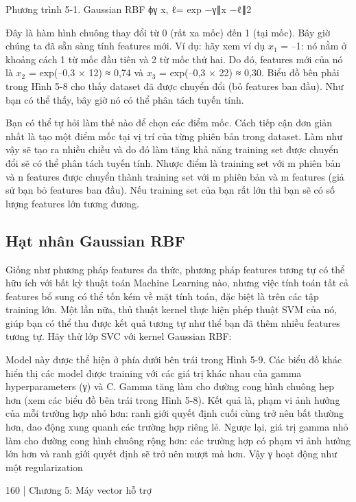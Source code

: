 Phương trình 5-1. Gaussian RBF ϕγ x, ℓ= exp −γ∥x −ℓ∥2

Đây là hàm hình chuông thay đổi từ 0 (rất xa mốc) đến 1 (tại mốc). Bây giờ chúng ta đã sẵn sàng tính features mới. Ví dụ: hãy xem ví dụ $x_{1}$ = –1: nó nằm ở khoảng cách 1 từ mốc đầu tiên và 2 từ mốc thứ hai. Do đó, features mới của nó là $x_{2}$ = exp(–0,3 × 12) ≈ 0,74 và $x_{3}$ = exp(–0,3 × 22) ≈ 0,30. Biểu đồ bên phải trong Hình 5-8 cho thấy dataset đã được chuyển đổi (bỏ features ban đầu). Như bạn có thể thấy, bây giờ nó có thể phân tách tuyến tính.

Bạn có thể tự hỏi làm thế nào để chọn các điểm mốc. Cách tiếp cận đơn giản nhất là tạo một điểm mốc tại vị trí của từng phiên bản trong dataset. Làm như vậy sẽ tạo ra nhiều chiều và do đó làm tăng khả năng training set được chuyển đổi sẽ có thể phân tách tuyến tính. Nhược điểm là training set với m phiên bản và n features được chuyển thành training set với m phiên bản và m features (giả sử bạn bỏ features ban đầu). Nếu training set của bạn rất lớn thì bạn sẽ có số lượng features lớn tương đương.

\subsection{Hạt nhân Gaussian RBF}

Giống như phương pháp features đa thức, phương pháp features tương tự có thể hữu ích với bất kỳ thuật toán Machine Learning nào, nhưng việc tính toán tất cả features bổ sung có thể tốn kém về mặt tính toán, đặc biệt là trên các tập training lớn. Một lần nữa, thủ thuật kernel thực hiện phép thuật SVM của nó, giúp bạn có thể thu được kết quả tương tự như thể bạn đã thêm nhiều features tương tự. Hãy thử lớp SVC với kernel Gaussian RBF:

Model này được thể hiện ở phía dưới bên trái trong Hình 5-9. Các biểu đồ khác hiển thị các model được training với các giá trị khác nhau của gamma hyperparameters (γ) và C. Gamma tăng làm cho đường cong hình chuông hẹp hơn (xem các biểu đồ bên trái trong Hình 5-8). Kết quả là, phạm vi ảnh hưởng của mỗi trường hợp nhỏ hơn: ranh giới quyết định cuối cùng trở nên bất thường hơn, dao động xung quanh các trường hợp riêng lẻ. Ngược lại, giá trị gamma nhỏ làm cho đường cong hình chuông rộng hơn: các trường hợp có phạm vi ảnh hưởng lớn hơn và ranh giới quyết định sẽ trở nên mượt mà hơn. Vậy γ hoạt động như một regularization

160 | Chương 5: Máy vector hỗ trợ

